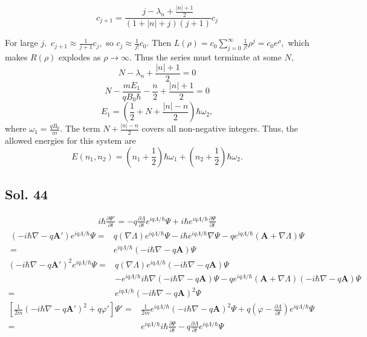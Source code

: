 \begin{enumerate}
        $$
        c_{j+1} = 
        \frac{j-\lambda_n+\frac{|n|+1}{2}}{(1+|n|+j)(j+1)}c_j
        $$

        For large $j,$ $c_{j+1}\approx \frac{1}{j+1}c_j,$ 
        so $c_{j}\approx \frac{1}{j!}c_0.$ 
        Then $L(\rho)=c_0\sum_{j=0}^\infty \frac{1}{j!}\rho^j = c_0e^\rho,$ which makes $R(\rho)$ explodes as $\rho\to\infty.$ Thus the series must terminate at some $N,$ 
        $$
        N-\lambda_n + \frac{|n|+1}{2} = 0
        $$
        $$
        N - \frac{mE_1}{qB_0\hbar} - \frac{n}{2} + 
        \frac{|n|+1}{2} = 0
        $$
        $$
        E_1 = \left(\frac{1}{2} + N+\frac{|n|-n}{2}\right)\hbar\omega_2,
        $$
        where $\omega_1=\frac{qB_0}{m}.$ The term $ N+\frac{|n|-n}{2}$ covers all non-negative integers. Thus, the allowed energies for this system are
        $$
        E(n_1,n_2) = \left(n_1+\frac{1}{2}\right)\hbar\omega_1 + \left(n_2+\frac{1}{2}\right)\hbar\omega_2.
        $$
        
        
       \end{enumerate}

       \subsection*{Sol. 44}

       \begin{align*}
           i\hbar\frac{\partial\Psi'}{\partial t}
           =-q\frac{\partial \Lambda}{\partial t}e^{iq\Lambda/\hbar}\Psi + i\hbar e^{iq\Lambda/\hbar}\frac{\partial\Psi}{\partial t}
       \end{align*}
       \begin{align*}
           (-i\hbar\nabla-q\bm A')e^{iq\Lambda/\hbar}\Psi
           =&q(\nabla \Lambda)e^{iq\Lambda/\hbar}\Psi
           -i\hbar e^{iq\Lambda/\hbar}\nabla \Psi
           - qe^{iq\Lambda/\hbar}(\bm A+\nabla\Lambda)\Psi\\
           =&
           e^{iq\Lambda/\hbar}(-i\hbar \nabla - q\bm A)\Psi
       \end{align*}
       \begin{align*}
           (-i\hbar\nabla-q\bm A')^2e^{iq\Lambda/\hbar}\Psi=&
           q(\nabla\Lambda)e^{iq\Lambda/\hbar}
           (-i\hbar \nabla - q\bm A)\Psi\\
           &-e^{iq\Lambda/\hbar}i\hbar\nabla(-i\hbar \nabla - q\bm A)\Psi
           -qe^{iq\Lambda/\hbar}
           (\bm A+\nabla\Lambda)(-i\hbar\nabla-q\bm A)\Psi\\
           =&
           e^{iq\Lambda/\hbar}(-i\hbar \nabla - q\bm A)^2\Psi
       \end{align*}
       \begin{align*}
           \left[
           \frac{1}{2m}(-i\hbar\nabla-q\bm A')^2
           +q\varphi'
           \right]\Psi'
           =&
           \frac{1}{2m}
           e^{iq\Lambda/\hbar}(-i\hbar \nabla - q\bm A)^2\Psi
           +q(\varphi-\frac{\partial\Lambda}{\partial t})
           e^{iq\Lambda/\hbar}\Psi\\
           =&e^{iq\Lambda/\hbar}i\hbar\frac{\partial\Psi}{\partial t} -q\frac{\partial\Lambda}{\partial t}e^{iq\Lambda/\hbar}\Psi
       \end{align*}
